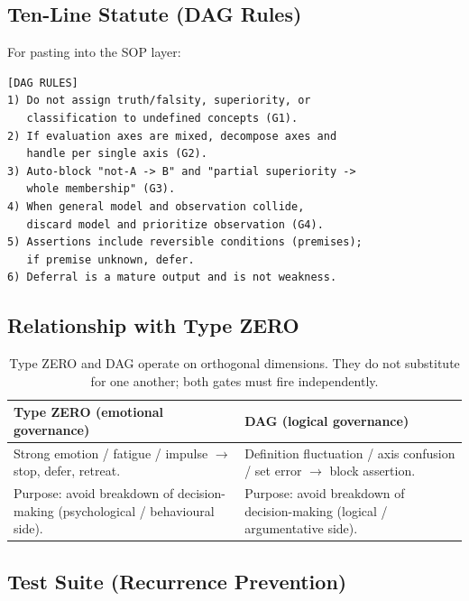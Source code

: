 \subsection{Ten-Line Statute (DAG Rules)}
\label{sec:dag-ten-line-statute}

For pasting into the SOP layer:

\begin{lstlisting}[basicstyle=\ttfamily\small,frame=single]
[DAG RULES]
1) Do not assign truth/falsity, superiority, or
   classification to undefined concepts (G1).
2) If evaluation axes are mixed, decompose axes and
   handle per single axis (G2).
3) Auto-block "not-A -> B" and "partial superiority ->
   whole membership" (G3).
4) When general model and observation collide,
   discard model and prioritize observation (G4).
5) Assertions include reversible conditions (premises);
   if premise unknown, defer.
6) Deferral is a mature output and is not weakness.
\end{lstlisting}

\subsection{Relationship with Type ZERO}
\label{sec:dag-vs-type-zero-c2}

\begin{table}[ht]
\centering
\small
\begin{tabularx}{\linewidth}{XX}
\toprule
\textbf{Type ZERO (emotional governance)}
& \textbf{DAG (logical governance)} \\
\midrule
Strong emotion / fatigue / impulse $\to$ stop, defer, retreat.
& Definition fluctuation / axis confusion / set error $\to$ block
assertion. \\
Purpose: avoid breakdown of decision-making
(psychological / behavioural side).
& Purpose: avoid breakdown of decision-making
(logical / argumentative side). \\
\bottomrule
\end{tabularx}
\caption[Type ZERO vs DAG]{Type ZERO and DAG operate on orthogonal
dimensions. They do not substitute for one another; both gates must
fire independently.}
\label{tab:type-zero-vs-dag-c2}
\end{table}

\subsection{Test Suite (Recurrence Prevention)}
\label{sec:dag-tests-c2}

